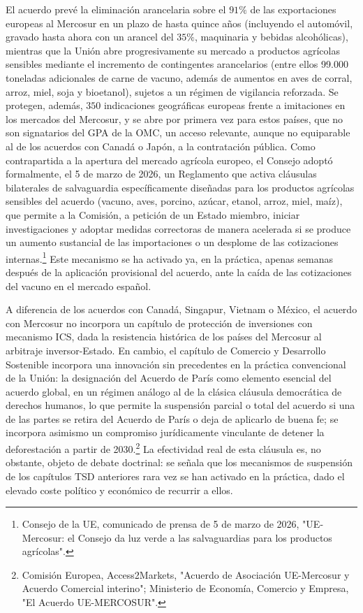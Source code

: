 \documentclass[10pt,a4paper]{article}
\begin{document}
El acuerdo prevé la eliminación arancelaria sobre el $91\%$ de las exportaciones europeas al Mercosur en un plazo de hasta quince años (incluyendo el automóvil, gravado hasta ahora con un arancel del $35\%$, maquinaria y bebidas alcohólicas), mientras que la Unión abre progresivamente su mercado a productos agrícolas sensibles mediante el incremento de contingentes arancelarios (entre ellos 99.000 toneladas adicionales de carne de vacuno, además de aumentos en aves de corral, arroz, miel, soja y bioetanol), sujetos a un régimen de vigilancia reforzada. Se protegen, además, $350$ indicaciones geográficas europeas frente a imitaciones en los mercados del Mercosur, y se abre por primera vez para estos países, que no son signatarios del GPA de la OMC, un acceso relevante, aunque no equiparable al de los acuerdos con Canadá o Japón, a la contratación pública. Como contrapartida a la apertura del mercado agrícola europeo, el Consejo adoptó formalmente, el 5 de marzo de 2026, un Reglamento que activa cláusulas bilaterales de salvaguardia específicamente diseñadas para los productos agrícolas sensibles del acuerdo (vacuno, aves, porcino, azúcar, etanol, arroz, miel, maíz), que permite a la Comisión, a petición de un Estado miembro, iniciar investigaciones y adoptar medidas correctoras de manera acelerada si se produce un aumento sustancial de las importaciones o un desplome de las cotizaciones internas.\footnote{%
    Consejo de la UE, comunicado de prensa de 5 de marzo de 2026, "UE-Mercosur: el Consejo da luz verde a las salvaguardias para los productos agrícolas".
} Este mecanismo se ha activado ya, en la práctica, apenas semanas después de la aplicación provisional del acuerdo, ante la caída de las cotizaciones del vacuno en el mercado español.

A diferencia de los acuerdos con Canadá, Singapur, Vietnam o México, el acuerdo con Mercosur no incorpora un capítulo de protección de inversiones con mecanismo ICS, dada la resistencia histórica de los países del Mercosur al arbitraje inversor-Estado. En cambio, el capítulo de Comercio y Desarrollo Sostenible incorpora una innovación sin precedentes en la práctica convencional de la Unión: la designación del Acuerdo de París como elemento esencial del acuerdo global, en un régimen análogo al de la clásica cláusula democrática de derechos humanos, lo que permite la suspensión parcial o total del acuerdo si una de las partes se retira del Acuerdo de París o deja de aplicarlo de buena fe; se incorpora asimismo un compromiso jurídicamente vinculante de detener la deforestación a partir de 2030.\footnote{%
    Comisión Europea, Access2Markets, "Acuerdo de Asociación UE-Mercosur y Acuerdo Comercial interino"; Ministerio de Economía, Comercio y Empresa, "El Acuerdo UE-MERCOSUR".
} La efectividad real de esta cláusula es, no obstante, objeto de debate doctrinal: se señala que los mecanismos de suspensión de los capítulos TSD anteriores rara vez se han activado en la práctica, dado el elevado coste político y económico de recurrir a ellos.
\end{document}
